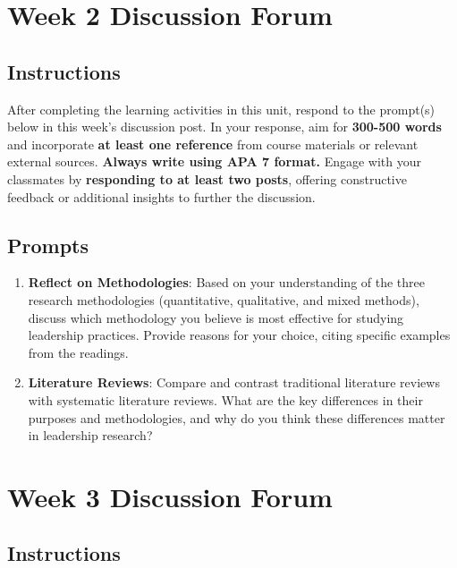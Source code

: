 \documentclass[
  letterpaper,
  DIV=11,
  numbers=noendperiod]{scrreprt}
\providecommand{\tightlist}{%
  \setlength{\itemsep}{0pt}\setlength{\parskip}{0pt}}\usepackage{longtable,booktabs,array}
\begin{document}

\chapter{Week 2 Discussion Forum}\label{week-2-discussion-forum}

\section{Instructions}\label{instructions-1}

After completing the learning activities in this unit, respond to the
prompt(s) below in this week's discussion post. In your response, aim
for \textbf{300-500 words} and incorporate \textbf{at least one
reference} from course materials or relevant external sources.
\textbf{Always write using APA 7 format.} Engage with your classmates by
\textbf{responding to at least two posts}, offering constructive
feedback or additional insights to further the discussion.

\section{Prompts}\label{prompts-1}

\begin{enumerate}
\def\labelenumi{\arabic{enumi}.}
\tightlist
\item
  \textbf{Reflect on Methodologies}: Based on your understanding of the
  three research methodologies (quantitative, qualitative, and mixed
  methods), discuss which methodology you believe is most effective for
  studying leadership practices. Provide reasons for your choice, citing
  specific examples from the readings.
\item
  \textbf{Literature Reviews}: Compare and contrast traditional
  literature reviews with systematic literature reviews. What are the
  key differences in their purposes and methodologies, and why do you
  think these differences matter in leadership research?
\end{enumerate}


\chapter{Week 3 Discussion Forum}\label{week-3-discussion-forum}

\section{Instructions}\label{instructions-2}
\end{document}
